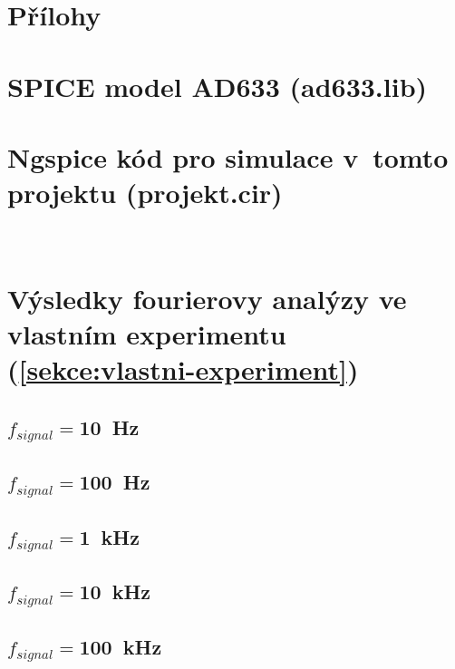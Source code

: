 \documentclass{protokol}
\begin{document}
\clearpage

\section*{Přílohy}

\appendix %
\section{SPICE model \textbf{AD633} (ad633.lib)}
\label{priloha:spicemodel}


\section{Ngspice kód pro simulace v~tomto projektu (projekt.cir)}
\label{priloha:projekt.cir}


\(\) 
\section{Výsledky fourierovy analýzy ve vlastním experimentu (\ref{sekce:vlastni-experiment})}
\label{priloha:fourier-data}
\subsection{\(f_{signal} =\)\qty{10}{\hertz}}


\subsection{\(f_{signal} =\)\qty{100}{\hertz}}


\subsection{\(f_{signal} =\)\qty{1}{\kilo\hertz}}


\subsection{\(f_{signal} =\)\qty{10}{\kilo\hertz}}


\subsection{\(f_{signal} =\)\qty{100}{\kilo\hertz}}

\end{document}
